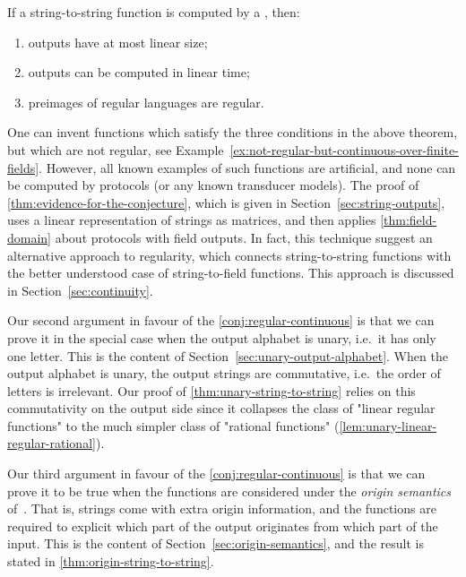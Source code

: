 \begin{theorem}\label{thm:evidence-for-the-conjecture}
    If a string-to-string function  is  computed by a , then:
    \begin{enumerate}
        \item \label{it:linear-size-outputs} outputs have at most linear size;
        \item \label{it:linear-time-computable} outputs can be   computed in linear time;
        \item \label{it:regular-preimages} preimages of regular languages are regular.
    \end{enumerate}
\end{theorem}

One can invent functions which satisfy the three conditions in the above
theorem, but which are not regular, see
Example~\ref{ex:not-regular-but-continuous-over-finite-fields}. However, all
known examples of such functions  are artificial, and none can be computed by
protocols (or any known transducer models).  The proof of
\cref{thm:evidence-for-the-conjecture}, which is given in
Section~\ref{sec:string-outputs}, uses a linear representation of strings as
matrices, and then applies \cref{thm:field-domain} about protocols with field
outputs. In fact, this technique suggest an alternative approach to regularity,
which connects string-to-string functions with the better understood case of
string-to-field functions. This approach is discussed in
Section~\ref{sec:continuity}.

Our second argument in favour of the \cref{conj:regular-continuous} is that we
can prove it in the special case when the output alphabet is unary, i.e.~it has
only one letter. This is the content of
Section~\ref{sec:unary-output-alphabet}. When the output alphabet is unary, the
output strings are commutative, i.e.~the order of letters is irrelevant. Our
proof of \cref{thm:unary-string-to-string} relies on this commutativity on the
output side since it collapses the class of "linear regular functions" to the
much simpler class of "rational functions"
(\cref{lem:unary-linear-regular-rational}).

Our third argument in favour of the \cref{conj:regular-continuous} is that we
can prove it to be true when the functions are considered under the
\emph{origin semantics} of~\cite{bojanczykTransducersOriginInformation2014}.
That is, strings come with extra origin information, and the functions are
required to explicit which part of the output originates from which part of the
input. This is the content of Section~\ref{sec:origin-semantics}, and the
result is stated in \cref{thm:origin-string-to-string}. 

